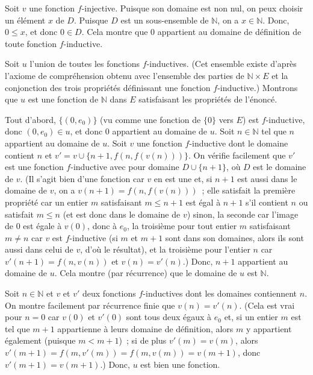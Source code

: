    Soit $v$ une fonction $f$-injective. 
   Puisque son domaine est non nul, on peux choisir un élément $x$ de $D$. 
   Puisque $D$ est un sous-ensemble de $\mathbb{N}$, on a $x \in \mathbb{N}$. 
   Donc, $0  \leq x$, et donc $0 \in D$.
   Cela montre que $0$ appartient au domaine de définition de toute fonction $f$-inductive. 

   Soit $u$ l'union de toutes les fonctions $f$-inductives. 
   (Cet ensemble existe d'après l'axiome de compréhension obtenu avec l'ensemble des parties de $\mathbb{N} \times E$ et la conjonction des trois propriétés définissant une fonction $f$-inductive.)
   Montrons que $u$ est une fonction de $\mathbb{N}$ dans $E$ satisfaisant les propriétés de l'énoncé. 

   Tout d'abord, $\lbrace (0,e_0) \rbrace$ (vu comme une fonction de $\lbrace 0 \rbrace$ vers $E$) est $f$-inductive, donc $(0,e_0) \in u$, et donc $0$ appartient au domaine de $u$.
   Soit $n \in \mathbb{N}$ tel que $n$ appartient au domaine de $u$. 
   Soit $v$ une fonction $f$-inductive dont le domaine contient $n$ et $v' = v \cup \lbrace n+1, f(n, f(v(n))) \rbrace$. 
   On vérifie facilement que $v'$ est une fonction $f$-inductive avec pour domaine $D \cup \lbrace n+1 \rbrace$, où $D$ est le domaine de $v$. 
   (Il s'agit bien d'une fonction car $v$ en est une et, si $n+1$ est aussi dans le domaine de $v$, on a $v(n+1) = f(n, f(v(n)))$ ; elle satisfait la première propriété car un entier $m$ satisfaisant $m \leq n+1$ est égal à $n+1$ s'il contient $n$ ou satisfait $m \leq n$ (et est donc dans le domaine de $v$) sinon, la seconde car l'image de $0$ est égale à $v(0)$, donc à $e_0$, la troisième pour tout entier $m$ satisfaisant $m \neq n$ car $v$ est $f$-inductive (si $m$ et $m+1$ sont dans son domaines, alors ils sont aussi dans celui de $v$, d'où le résultat), et la troisième pour l'entier $n$ car $v'(n+1) = f(n,v(n))$ et $v(n) = v'(n)$.)
   Donc, $n+1$ appartient au domaine de $u$. 
   Cela montre (par récurrence) que le domaine de $u$ est $\mathbb{N}$. 

   Soit $n \in \mathbb{N}$ et $v$ et $v'$ deux fonctions $f$-inductives dont les domaines contiennent $n$. 
   On montre facilement par récurrence finie que $v(n) = v'(n)$. 
   (Cela est vrai pour $n=0$ car $v(0)$ et $v'(0)$ sont tous deux égaux à $e_0$ et, si un entier $m$ est tel que $m+1$ appartienne à leurs domaine de définition, alors $m$ y appartient également (puisque $m < m+1$) ; si de plus $v'(m) = v(m)$, alors $v'(m+1) = f(m,v'(m)) = f(m,v(m)) = v(m+1)$, donc $v'(m+1) = v(m+1)$.)
   Donc, $u$ est bien une fonction.

